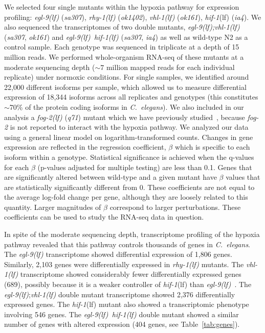 \documentclass[10pt, onecolumn]{article}
\newcommand{\cel}{\emph{C.~elegans}}
\newcommand{\gene}[1]{\emph{#1}}
\newcommand{\fog}{\emph{\mbox{fog-2(lf)}}}
\newcommand{\egl}{\emph{\mbox{egl-9}(lf)}}
\newcommand{\rhy}{\emph{\mbox{rhy-1}(lf)}}
\newcommand{\vhl}{\emph{\mbox{vhl-1}(lf)}}
\newcommand{\eglvhl}{\emph{\mbox{egl-9(lf);vhl-1(lf)}}}
\newcommand{\eglhif}{\emph{\mbox{egl-9(lf)}~\mbox{hif-1(lf)}}}
\newcommand{\hif}{\emph{\mbox{hif-1}}(lf)}
\newcommand{\egln}{1,806}
\newcommand{\rhyn}{2,103}
\newcommand{\vhln}{689}
\newcommand{\eglvhln}{2,376}
\newcommand{\hifn}{546}
\newcommand{\eglhifn}{404}
\begin{document}
We selected four single mutants within the hypoxia pathway for expression profiling:
\egl{} (\emph{sa307}), \rhy{} (\emph{ok1402}), \vhl{} (\emph{ok161}), \hif{} (\emph{ia4}).
We also sequenced the transcriptomes of two double mutants, \eglvhl{} (\emph{sa307},
\emph{ok161}) and \eglhif{} (\emph{sa307}, \emph{ia4}) as well as wild-type N2 as
a control sample. Each genotype  was sequenced in triplicate at a depth of 15
million reads. We performed whole-organism RNA-seq of these mutants at a moderate
sequencing depth ($\sim7$ million mapped reads for each individual replicate)
under normoxic conditions. For single samples, we identified around 22,000 different
isoforms per sample, which allowed us to measure differential expression of 18,344
isoforms across all replicates and genotypes (this constitutes  $\sim$70\% of
the protein coding isoforms in \cel{}).
We also included in our analysis a \fog{} (\emph{q71}) mutant which we have previously
studied~\cite{Angeles-Albores2016a}, because \gene{fog-2} is not reported to
interact with the hypoxia pathway.
We analyzed our data using a general linear model on
logarithm-transformed counts. Changes in gene expression are reflected in the
regression coefficient, $\beta$ which is specific to each isoform within a genotype.
Statistical significance is achieved when the q-values for each $\beta$ (p-values
adjusted for multiple testing) are less than 0.1. Genes that are significantly
altered between wild-type and a given mutant have $\beta$ values that are
statistically significantly different from 0.  These coefficients are not equal
to the average log-fold change per gene, although they are loosely related to
this quantity. Larger magnitudes of $\beta$ correspond to larger perturbations.
These coefficients can be used to study the RNA-seq data in question.

In spite of the moderate sequencing depth, transcriptome profiling of the hypoxia
pathway revealed that this pathway controls thousands of genes in \cel{}. The
\egl{} transcriptome showed differential expression of \egln{} genes. Similarly,
\rhyn{} genes were differentially expressed in \rhy{} mutants. The \vhl{}
transcriptome showed considerably fewer differentially expressed genes (\vhln{}),
possibly because it is a weaker controller of \hif{} than
\egl{}~\cite{Shao2009}. The \egl{};\vhl{} double mutant transcriptome showed
\eglvhln{} differentially expressed genes. The \hif{} mutant also showed a
transcriptomic phenotype involving \hifn{} genes. The \eglhif{} double mutant
showed a similar number of genes with altered expression (\eglhifn{} genes, see
Table~\ref{tab:genes}).
\end{document}
